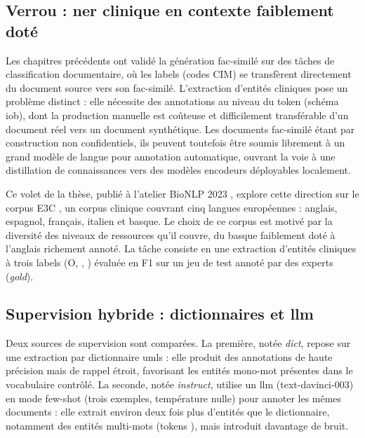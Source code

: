 

\subsection{Verrou : \gls{ner} clinique en contexte faiblement doté}

Les chapitres précédents ont validé la génération fac-similé sur des tâches de classification documentaire, où les labels (codes CIM) se transfèrent directement du document source vers son fac-similé.
L'extraction d'entités cliniques pose un problème distinct : elle nécessite des annotations au niveau du token (schéma \gls{iob}), dont la production manuelle est coûteuse et difficilement transférable d'un document réel vers un document synthétique.
Les documents fac-similé étant par construction non confidentiels, ils peuvent toutefois être soumis librement à un grand modèle de langue pour annotation automatique, ouvrant la voie à une distillation de connaissances vers des modèles encodeurs déployables localement.

Ce volet de la thèse, publié à l'atelier BioNLP 2023 \citep{meoni2023large}, explore cette direction sur le corpus E3C \citep{Magnini2020TheCases}, un corpus clinique couvrant cinq langues européennes : anglais, espagnol, français, italien et basque.
Le choix de ce corpus est motivé par la diversité des niveaux de ressources qu'il couvre, du basque faiblement doté à l'anglais richement annoté.
La tâche consiste en une extraction d'entités cliniques à trois labels (O, \bclin, \iclin) évaluée en F1 sur un jeu de test annoté par des experts (\emph{gold}).

\subsection{Supervision hybride : dictionnaires et \gls{llm}}

Deux sources de supervision sont comparées.
La première, notée \emph{dict}, repose sur une extraction par dictionnaire \gls{umls} : elle produit des annotations de haute précision mais de rappel étroit, favorisant les entités mono-mot présentes dans le vocabulaire contrôlé.
La seconde, notée \emph{instruct}, utilise un \gls{llm} (text-davinci-003) en mode few-shot (trois exemples, température nulle) pour annoter les mêmes documents : elle extrait environ deux fois plus d'entités que le dictionnaire, notamment des entités multi-mots (tokens \iclin), mais introduit davantage de bruit.

